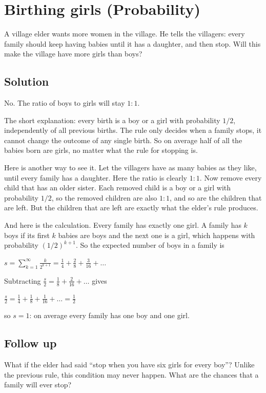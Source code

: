\section {Birthing girls (Probability)}

A village elder wants more women in the village. He tells the villagers:
every family should keep having babies until it has a daughter, and then stop.
Will this make the village have more girls than boys?

\subsection{Solution}

No. The ratio of boys to girls will stay $1:1$.

The short explanation: every birth is a boy or a girl with probability $1/2$, independently of all previous births.
The rule only decides when a family stops, it cannot change the outcome of any single birth.
So on average half of all the babies born are girls, no matter what the rule for stopping is.

Here is another way to see it. Let the villagers have as many babies as they like, until every family has a daughter.
Here the ratio is clearly $1:1$. Now remove every child that has an older sister.
Each removed child is a boy or a girl with probability $1/2$, so the removed children are also $1:1$, and so are the
children that are left. But the children that are left are exactly what the elder's rule produces.

And here is the calculation. Every family has exactly one girl.
A family has $k$ boys if its first $k$ babies are boys and the next one is a girl, which happens with probability $(1/2)^{k+1}$.
So the expected number of boys in a family is
\begin{center}
$s = \sum_{k=1}^{\infty} \frac{k}{2^{k+1}} = \frac{1}{4} + \frac{2}{8} + \frac{3}{16} + \ldots$
\end{center}
Subtracting $\frac{s}{2} = \frac{1}{8} + \frac{2}{16} + \ldots$ gives
\begin{center}
$\frac{s}{2} = \frac{1}{4} + \frac{1}{8} + \frac{1}{16} + \ldots = \frac{1}{2}$
\end{center}
so $s=1$: on average every family has one boy and one girl.

\subsection{Follow up}
What if the elder had said ``stop when you have six girls for every boy''?
Unlike the previous rule, this condition may never happen. What are the chances that a family will ever stop?

